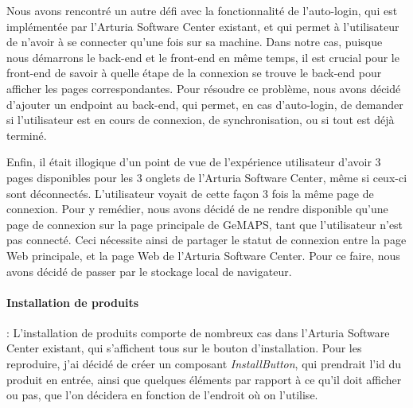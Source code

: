 \documentclass[francais]{rapportPFE}  %
\begin{document}
Nous avons rencontré un autre défi avec la fonctionnalité de l'auto-login, qui est implémentée par l'Arturia Software Center existant, et qui permet à l'utilisateur de n'avoir à se connecter qu'une fois sur sa machine. Dans notre cas, puisque nous démarrons le back-end et le front-end en même temps, il est crucial pour le front-end de savoir à quelle étape de la connexion se trouve le back-end pour afficher les pages correspondantes. Pour résoudre ce problème, nous avons décidé d'ajouter un endpoint au back-end, qui permet, en cas d'auto-login, de demander si l'utilisateur est en cours de connexion, de synchronisation, ou si tout est déjà terminé.

Enfin, il était illogique d'un point de vue de l'expérience utilisateur d'avoir 3 pages disponibles pour les 3 onglets de l'Arturia Software Center, même si ceux-ci sont déconnectés. L'utilisateur voyait de cette façon 3 fois la même page de connexion. Pour y remédier, nous avons décidé de ne rendre disponible qu'une page de connexion sur la page principale de GeMAPS, tant que l'utilisateur n'est pas connecté. Ceci nécessite ainsi de partager le statut de connexion entre la page Web principale, et la page Web de l'Arturia Software Center. Pour ce faire, nous avons décidé de passer par le stockage local de navigateur. 


\paragraph{Installation de produits}: L'installation de produits comporte de nombreux cas dans l'Arturia Software Center existant, qui s'affichent tous sur le bouton d'installation. Pour les reproduire, j'ai décidé de créer un composant \textit{InstallButton}, qui prendrait l'id du produit en entrée, ainsi que quelques éléments par rapport à ce qu'il doit afficher ou pas, que l'on décidera en fonction de l'endroit où on l'utilise. 
\end{document}
